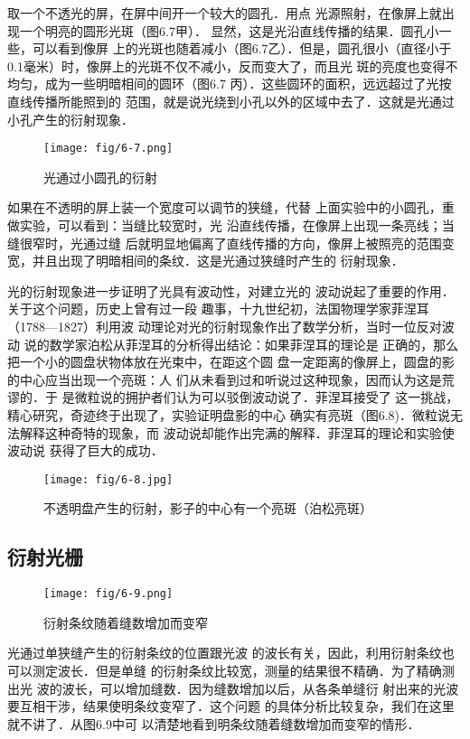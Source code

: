 取一个不透光的屏，在屏中间开一个较大的圆孔．用点
光源照射，在像屏上就出现一个明亮的圆形光斑（图6.7甲）．
显然，这是光沿直线传播的结果．圆孔小一些，可以看到像屏
上的光斑也随着减小（图6.7乙）．但是，圆孔很小（直径小于
0.1毫米）时，像屏上的光斑不仅不减小，反而变大了，而且光
斑的亮度也变得不均匀，成为一些明暗相间的圆环（图6.7
丙）．这些圆环的面积，远远超过了光按直线传播所能照到的
范围，就是说光绕到小孔以外的区域中去了．这就是光通过
小孔产生的衍射现象．
\begin{figure}[htp]\centering
    \texttt{[image: fig/6-7.png]}
    \caption{光通过小圆孔的衍射}
    \end{figure}

如果在不透明的屏上装一个宽度可以调节的狭缝，代替
上面实验中的小圆孔，重做实验，可以看到：当缝比较宽时，光
沿直线传播，在像屏上出现一条亮线；当缝很窄时，光通过缝
后就明显地偏离了直线传播的方向，像屏上被照亮的范围变
宽，并且出现了明暗相间的条纹．这是光通过狭缝时产生的
衍射现象．

光的衍射现象进一步证明了光具有波动性，对建立光的
波动说起了重要的作用．关于这个问题，历史上曾有过一段
趣事，十九世纪初，法国物理学家菲涅耳（1788—1827）利用波
动理论对光的衍射现象作出了数学分析，当时一位反对波动
说的数学家泊松从菲涅耳的分析得出结论：如果菲涅耳的理论是
正确的，那么把一个小的圆盘状物体放在光束中，在距这个圆
盘一定距离的像屏上，圆盘的影的中心应当出现一个亮斑：人
们从未看到过和听说过这种现象，因而认为这是荒谬的．于
是微粒说的拥护者们认为可以驳倒波动说了．菲涅耳接受了
这一挑战，精心研究，奇迹终于出现了，实验证明盘影的中心
确实有亮斑（图6.8)．微粒说无法解释这种奇特的现象，而
波动说却能作出完满的解释．菲涅耳的理论和实验使波动说
获得了巨大的成功．

\begin{figure}[htp]\centering
\texttt{[image: fig/6-8.jpg]}
\caption{不透明盘产生的衍射，影子的中心有一个亮斑（泊松亮斑）}
\end{figure}

\subsection{衍射光栅}
\begin{figure}[htp]\centering
	\texttt{[image: fig/6-9.png]}
	\caption{衍射条纹随着缝数增加而变窄}
\end{figure}

光通过单狭缝产生的衍射条纹的位置跟光波
的波长有关，因此，利用衍射条纹也可以测定波长．但是单缝
的衍射条纹比较宽，测量的结果很不精确．为了精确测出光
波的波长，可以增加缝数．因为缝数增加以后，从各条单缝衍
射出来的光波要互相干涉，结果使明条纹变窄了．这个问题
的具体分析比较复杂，我们在这里就不讲了．从图6.9中可
以清楚地看到明条纹随着缝数增加而变窄的情形．


